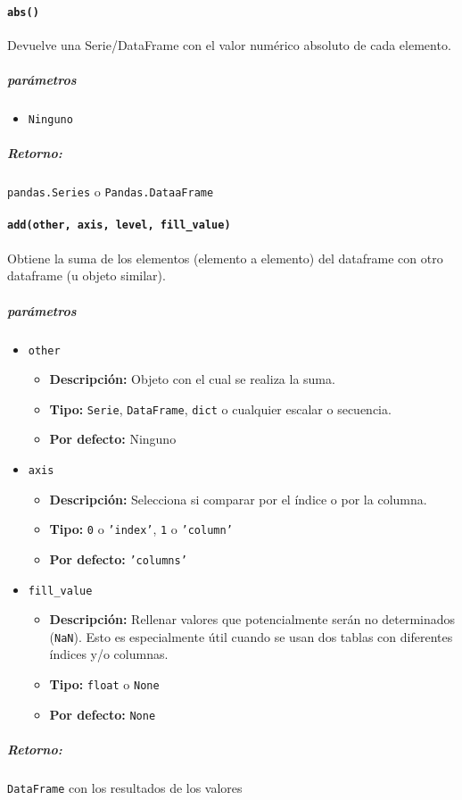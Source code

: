 \paragraph{\texttt{abs()}} Devuelve una Serie/DataFrame con el valor numérico absoluto de cada elemento.
\subparagraph{\textbf{parámetros}}
\begin{itemize}
\item \texttt{Ninguno}
\end{itemize}
\subparagraph{\textbf{Retorno:}} \texttt{pandas.Series} o \texttt{Pandas.DataaFrame}
\paragraph{\texttt{add(other, axis, level, fill\_value)}} Obtiene la suma de los elementos (elemento a elemento) del dataframe con otro dataframe (u objeto similar).
\subparagraph{\textbf{parámetros}}
\begin{itemize}
\item \texttt{other}
\begin{itemize}
\item \textbf{Descripción:} Objeto con el cual se realiza la suma.
\item \textbf{Tipo:} \texttt{Serie}, \texttt{DataFrame}, \texttt{dict} o cualquier escalar o secuencia.
\item \textbf{Por defecto:} Ninguno
\end{itemize}
\item \texttt{axis}
\begin{itemize}
\item \textbf{Descripción:} Selecciona si comparar por el índice o por la columna.
\item \textbf{Tipo:} \texttt{0} o \texttt{'index'}, \texttt{1} o \texttt{'column'}
\item \textbf{Por defecto:} \texttt{'columns'}
\end{itemize}
\item \texttt{fill\_value}
\begin{itemize}
\item \textbf{Descripción:} Rellenar valores que potencialmente serán no determinados (\texttt{NaN}). Esto es especialmente útil cuando se usan dos tablas con diferentes índices y/o columnas.
\item \textbf{Tipo:} \texttt{float} o \texttt{None}
\item \textbf{Por defecto:} \texttt{None}
\end{itemize}
\end{itemize}
\subparagraph{Retorno:} \texttt{DataFrame} con los resultados de los valores
